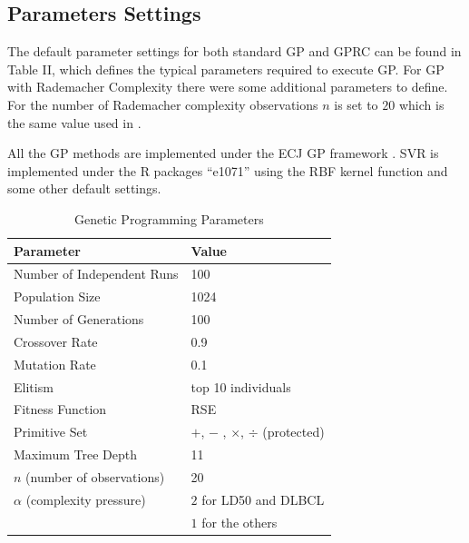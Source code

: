 \documentclass[conference]{IEEEtran}
\begin{document}
\subsection{Parameters Settings}
The default parameter settings for both standard GP and GPRC can be found in Table II, which defines the typical parameters required to execute GP. For GP with Rademacher Complexity there were some additional parameters to define. For the number of Rademacher complexity observations $n$ is set to $20$ which is the same value used in \cite{b15}. 


All the GP methods are implemented under the ECJ GP framework \cite{b24}. SVR is implemented under the R packages ``e1071'' \cite{b25} using the RBF kernel function and some other default settings.

\begin{table}[!ht]
\caption{Genetic Programming Parameters}
\begin{center}
\begin{tabular}{|l|l|}
\hline
\textbf{Parameter}    & \textbf{Value} \\ \hline
Number of Independent Runs  & 100       \\ \hline
Population Size       & 1024            \\ \hline
Number of Generations & 100            \\ \hline
Crossover Rate        & 0.9            \\ \hline
Mutation Rate         & 0.1            \\ \hline
Elitism         & top 10 individuals            \\ \hline
Fitness Function      & RSE            \\ \hline
Primitive Set         & $+$, $-$ , $\times$, $\div$ (protected)   \\ \hline
Maximum Tree Depth    & 11             \\ \hline\hline
$n$ (number of observations) & 20\\\hline
$\alpha$ (complexity pressure) & $2$ for LD50 and DLBCL \\
&$1$ for the others\\\hline
\end{tabular}
\end{center}
\end{table}

\end{document}
